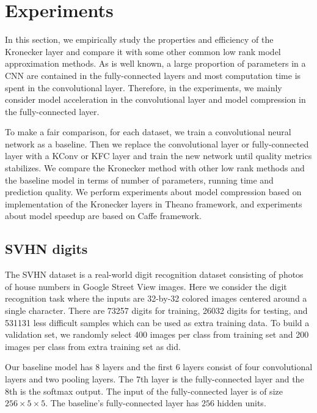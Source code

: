 \documentclass{article}
\begin{document}
\section{Experiments}
In this section, we empirically study the properties and efficiency of the Kronecker layer and compare it with some other common low rank model
approximation methods. As is well known, a large proportion of parameters in a CNN are contained in the fully-connected layers and most computation time is spent in the convolutional layer. Therefore, in the experiments, we mainly consider model acceleration in the convolutional layer and model compression in the fully-connected layer.

To make a fair comparison, for each dataset, we train a convolutional neural network as a baseline.
Then we replace the convolutional layer or fully-connected layer with a KConv or KFC layer and train the new network until quality metrics stabilizes.
We compare the Kronecker method with other low rank methods and the baseline model in terms of number of parameters, running time and prediction
quality. We perform experiments about model compression based on implementation of the Kronecker layers in
Theano \cite{bergstra+al:2010-scipy,Bastien-Theano-2012} framework, and experiments about model speedup are based on Caffe \cite{jia2014caffe} framework.



\subsection{SVHN digits}
The SVHN dataset \cite{netzer2011reading} is a real-world digit recognition dataset consisting of photos of house numbers in Google Street View images.
Here we consider the digit recognition task where the inputs are 32-by-32 colored images centered around a single character.
There are 73257 digits for training, 26032 digits for testing, and 531131 less difficult samples which can be used as extra training data.
To build a validation set, we randomly select 400 images per class from training set and 200 images per class from extra training set as \cite{sermanet2012convolutional,DBLP:conf/icml/GoodfellowWMCB13} did.

Our baseline model has $8$ layers and the first $6$ layers consist of four convolutional layers and two pooling layers. The 7th layer is the
fully-connected layer and the 8th is the softmax output. The input of the fully-connected layer is of size $256\times5\times5$. The baseline's
fully-connected layer has $256$ hidden units.
\end{document}
